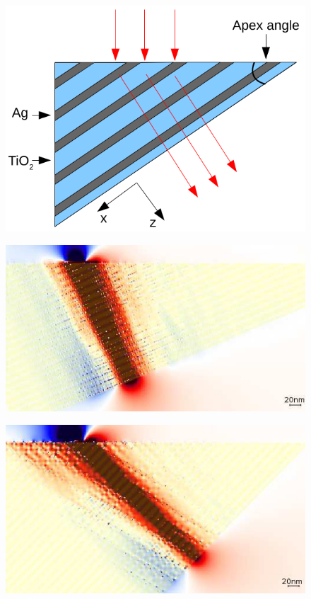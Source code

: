
			\begin{figure}
				\includegraphics[width=\textwidth]{images/multilayer/prism.png}
			\end{figure}


			\begin{figure}
				\includegraphics[width=\textwidth]{images/multilayer/prism04.png} \\
			\end{figure}
			\begin{figure}
				\includegraphics[width=\textwidth]{images/multilayer/prism08.png} \\
			\end{figure}

